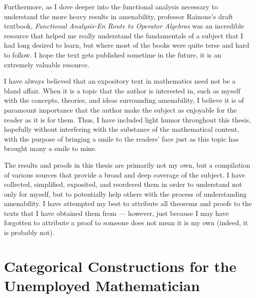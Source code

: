 \documentclass[10pt]{package2}
\begin{document}
Furthermore, as I dove deeper into the functional analysis necessary to understand the more heavy results in amenability, professor Rainone's draft textbook, \textit{Functional Analysis-En Route to Operator Algebras} was an incredible resource that helped me really understand the fundamentals of a subject that I had long desired to learn, but where most of the books were quite terse and hard to follow. I hope the text gets published sometime in the future, it is an extremely valuable resource.\newline

I have always believed that an expository text in mathematics need not be a bland affair. When it is a topic that the author is interested in, such as myself with the concepts, theories, and ideas surrounding amenability, I believe it is of paramount importance that the author make the subject as enjoyable for the reader as it is for them. Thus, I have included light humor throughout this thesis, hopefully without interfering with the substance of the mathematical content, with the purpose of bringing a smile to the readers' face just as this topic has brought many a smile to mine.\newline

The results and proofs in this thesis are primarily not my own, but a compilation of various sources that provide a broad and deep coverage of the subject. I have collected, simplified, exposited, and reordered them in order to understand not only for myself, but to potentially help others with the process of understanding amenability. I have attempted my best to attribute all theorems and proofs to the texts that I have obtained them from --- however, just because I may have forgotten to attribute a proof to someone does not mean it is my own (indeed, it is probably not).
\chapter{Categorical Constructions for the Unemployed Mathematician}\label{ch:categorical_constructions}

\end{document}
